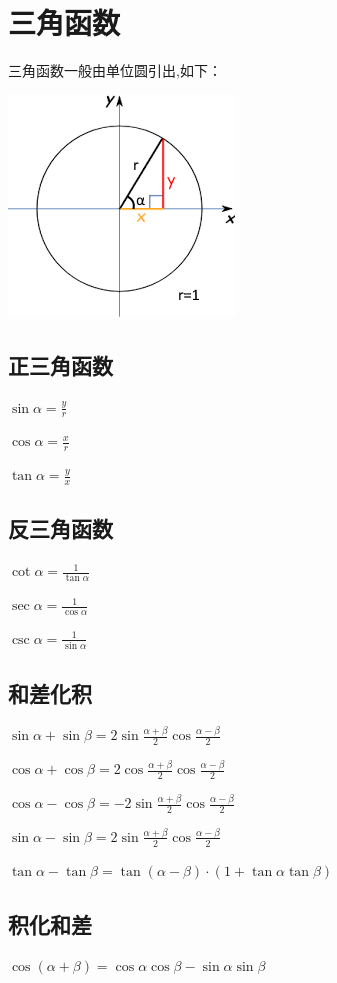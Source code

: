 \documentclass[UTF8]{ctexbook}
\begin{document}
{\section{三角函数}{
三角函数一般由单位圆引出,如下：

\includegraphics{resources/UnitCircle.png}

\subsection{正三角函数}{
  $\sin{\alpha} = \frac{y}{r}$

  $\cos{\alpha} = \frac{x}{r}$

  $\tan{\alpha} = \frac{y}{x}$
}
\subsection{反三角函数}{
  $\cot{\alpha} = \frac{1}{\tan{\alpha}}$

  $\sec{\alpha} = \frac{1}{\cos{\alpha}}$

  $\csc{\alpha} = \frac{1}{\sin{\alpha}}$
}

\subsection{和差化积}{
  $\sin{\alpha}+\sin{\beta} = 2\sin{\frac{\alpha + \beta}{2}}\cos{\frac{\alpha - \beta}{2}}$

  $\cos{\alpha}+\cos{\beta} = 2\cos{\frac{\alpha + \beta}{2}\cos{\frac{\alpha-\beta}{2}}}$

  $\cos{\alpha}-\cos{\beta} = -2\sin{\frac{\alpha + \beta}{2}}\cos{\frac{\alpha - \beta}{2}}$

  $\sin{\alpha}-\sin{\beta} = 2\sin{\frac{\alpha + \beta}{2}}\cos{\frac{\alpha - \beta}{2}}$

  $\tan\alpha - \tan\beta = \tan(\alpha - \beta) \cdot (1 + \tan\alpha\tan\beta)$
}

\subsection{积化和差}{
  $\cos(\alpha + \beta) = \cos{\alpha}\cos{\beta} - \sin{\alpha}\sin{\beta}$

}}}
\end{document}

